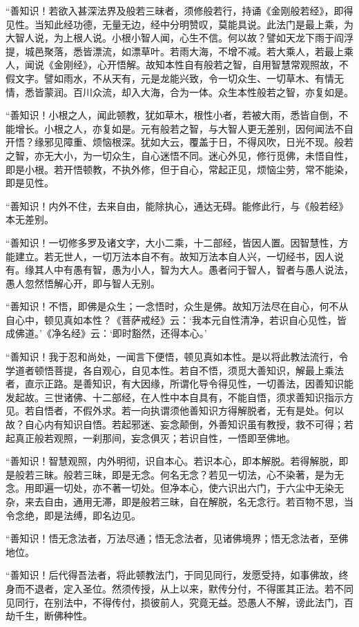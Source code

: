 \documentclass[UTF8, 11pt, oneside]{ctexart}
\begin{document}
“善知识！若欲入甚深法界及般若三昧者，须修般若行，持诵《金刚般若经》，即得见性。当知此经功德，无量无边，经中分明赞叹，莫能具说。此法门是最上乘，为大智人说，为上根人说。小根小智人闻，心生不信。何以故？譬如天龙下雨于阎浮提，城邑聚落，悉皆漂流，如漂草叶。若雨大海，不增不减。若大乘人，若最上乘人，闻说《金刚经》，心开悟解。故知本性自有般若之智，自用智慧常观照故，不假文字。譬如雨水，不从天有，元是龙能兴致，令一切众生、一切草木、有情无情，悉皆蒙润。百川众流，却入大海，合为一体。众生本性般若之智，亦复如是。

“善知识！小根之人，闻此顿教，犹如草木，根性小者，若被大雨，悉皆自倒，不能增长。小根之人，亦复如是。元有般若之智，与大智人更无差别，因何闻法不自开悟？缘邪见障重、烦恼根深。犹如大云，覆盖于日，不得风吹，日光不现。般若之智，亦无大小，为一切众生，自心迷悟不同。迷心外见，修行觅佛，未悟自性，即是小根。若开悟顿教，不执外修，但于自心，常起正见，烦恼尘劳，常不能染，即是见性。

“善知识！内外不住，去来自由，能除执心，通达无碍。能修此行，与《般若经》本无差别。

“善知识！一切修多罗及诸文字，大小二乘，十二部经，皆因人置。因智慧性，方能建立。若无世人，一切万法本自不有。故知万法本自人兴，一切经书，因人说有。缘其人中有愚有智，愚为小人，智为大人。愚者问于智人，智者与愚人说法，愚人忽然悟解心开，即与智人无别。

“善知识！不悟，即佛是众生；一念悟时，众生是佛。故知万法尽在自心，何不从自心中，顿见真如本性？《菩萨戒经》云：‘我本元自性清净，若识自心见性，皆成佛道。’《净名经》云：‘即时豁然，还得本心。’

“善知识！我于忍和尚处，一闻言下便悟，顿见真如本性。是以将此教法流行，令学道者顿悟菩提，各自观心，自见本性。若自不悟，须觅大善知识，解最上乘法者，直示正路。是善知识，有大因缘，所谓化导令得见性，一切善法，因善知识能发起故。三世诸佛、十二部经，在人性中本自具有，不能自悟，须求善知识指示方见。若自悟者，不假外求。若一向执谓须他善知识方得解脱者，无有是处。何以故？自心内有知识自悟。若起邪迷、妄念颠倒，外善知识虽有教授，救不可得；若起真正般若观照，一刹那间，妄念俱灭；若识自性，一悟即至佛地。

“善知识！智慧观照，内外明彻，识自本心。若识本心，即本解脱。若得解脱，即是般若三昧。般若三昧，即是无念。何名无念？若见一切法，心不染著，是为无念。用即遍一切处，亦不著一切处。但净本心，使六识出六门，于六尘中无染无杂，来去自由，通用无滞，即是般若三昧，自在解脱，名无念行。若百物不思，当令念绝，即是法缚，即名边见。

“善知识！悟无念法者，万法尽通；悟无念法者，见诸佛境界；悟无念法者，至佛地位。

“善知识！后代得吾法者，将此顿教法门，于同见同行，发愿受持，如事佛故，终身而不退者，定入圣位。然须传授，从上以来，默传分付，不得匿其正法。若不同见同行，在别法中，不得传付，损彼前人，究竟无益。恐愚人不解，谤此法门，百劫千生，断佛种性。
\end{document}
